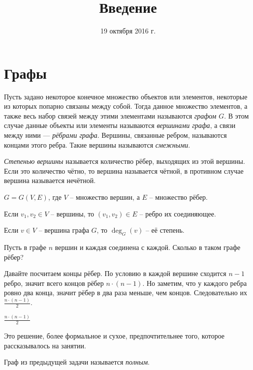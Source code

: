 \documentclass[a4paper, 11pt]{article}
\begin{document}
\renewcommand{\theequation}{\thesection.\arabic{equation}}
\renewcommand{\theex}{\thesection.\arabic{ex}}
\renewcommand{\eqdef}{\triangleq}

\renewcommand{\emptyset}{\varnothing}
\renewcommand{\phi}{\varphi}
\renewcommand{\epsilon}{\varepsilon}

\newcommand{\Cx}{\mathbb{C}}
\newcommand{\Hx}{\mathbb{H}}
\newcommand{\Zm}[1]{\mathbb{Z}_{#1}}
\newcommand{\fA}{~\forall\;}
\newcommand{\Ex}{~\exists\;}
\newcommand{\Exo}{~\exists\,!\;}
\title{Введение}
\date{19 октября 2016 г.}
\author{}
\maketitle{}
\section{Графы}
\begin{df}
	Пусть задано некоторое конечное множество объектов или элементов, некоторые из
	которых попарно связаны между собой. Тогда данное множество элементов, а также весь набор связей
	между этими элементами называются \textit{графом} $G$. В этом случае данные объекты или элементы называются
	\textit{вершинами графа}, а связи между ними — \textit{рёбрами графа}. Вершины, связанные ребром, называются
	концами этого ребра. Такие вершины называются \textit{смежными}.
\end{df}
\begin{df}
	\textit{Степенью вершины} называется количество рёбер, выходящих из этой вершины.
	Если это количество чётно, то вершина называется чётной, в противном случае вершина называется
	нечётной.
\end{df}
\begin{denotes}
	$G = G(V, E)$, где $V$ -- множество вершин, а $E$ -- множество рёбер.

	Если $v_1, v_2 \in V$ -- вершины, то $(v_1, v_2) \in E$ -- ребро их соединяющее.

	Если $v \in V$ -- вершина графа $G$, то $\deg_G (v)$ -- её степень.
\end{denotes}
\begin{problem}
	Пусть в графе $n$ вершин и каждая соединена с каждой. Сколько в таком графе рёбер?
\end{problem}
\begin{solution}
	Давайте посчитаем концы рёбер.
	По условию в каждой вершине сходится $n - 1$ ребро, значит всего концов рёбер $n \cdot (n - 1)$.
	Но заметим, что у каждого ребра ровно два конца, значит рёбер в два раза меньше, чем концов.
	Следовательно их $\frac{n \cdot (n - 1)}2$.
\end{solution}
\begin{answer}
	$\frac{n \cdot (n - 1)}2$
\end{answer}
\begin{note}
	Это решение, более формальное и сухое, предпочтительнее того, которое рассказывалось на занятии.
\end{note}
\begin{df}
	Граф из предыдущей задачи называется \textit{полным}.
\end{df}
\end{document}
